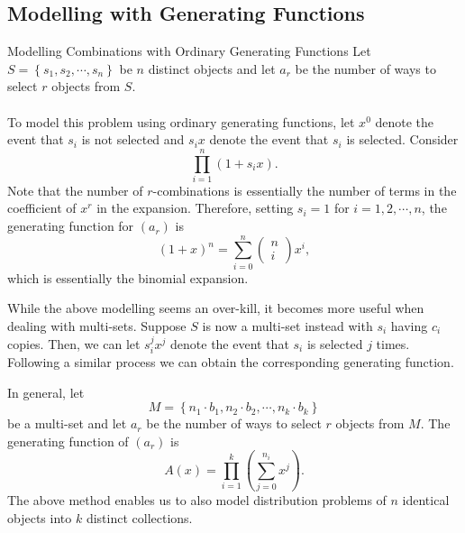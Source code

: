 \documentclass[math]{amznotes}
\theoremstyle{remark}
\begin{document}
\subsection{Modelling with Generating Functions}
\begin{tecbox}{\small Modelling Combinations with Ordinary Generating Functions}{}
    Let $S = \left\{s_1, s_2, \cdots, s_n\right\}$ be $n$ distinct objects and let $a_r$ be the number of ways to select $r$ objects from $S$.
    \\\\
    To model this problem using ordinary generating functions, let $x^0$ denote the event that $s_i$ is not selected and $s_ix$ denote the event that $s_i$ is selected. Consider
    \begin{equation*}
        \prod_{i = 1}^{n}(1 + s_ix).
    \end{equation*}
    Note that the number of $r$-combinations is essentially the number of terms in the coefficient of $x^r$ in the expansion. Therefore, setting $s_i = 1$ for $i = 1, 2, \cdots, n$, the generating function for $(a_r)$ is
    \begin{equation*}
        (1 + x)^n = \sum_{i = 0}^{n}\begin{pmatrix}
            n \\
            i
        \end{pmatrix}x^i,
    \end{equation*}
    which is essentially the binomial expansion.
\end{tecbox}
While the above modelling seems an over-kill, it becomes more useful when dealing with multi-sets. Suppose $S$ is now a multi-set instead with $s_i$ having $c_i$ copies. Then, we can let $s_i^jx^j$ denote the event that $s_i$ is selected $j$ times. Following a similar process we can obtain the corresponding generating function.

In general, let 
\begin{equation*}
    M = \left\{n_1 \cdot b_1, n_2 \cdot b_2, \cdots, n_k \cdot b_k\right\}
\end{equation*}
be a multi-set and let $a_r$ be the number of ways to select $r$ objects from $M$. The generating function of $(a_r)$ is
\begin{equation*}
    A(x) = \prod_{i = 1}^{k}\left(\sum_{j = 0}^{n_i}x^j\right).
\end{equation*}
The above method enables us to also model distribution problems of $n$ identical objects into $k$ distinct collections. 
\end{document}
